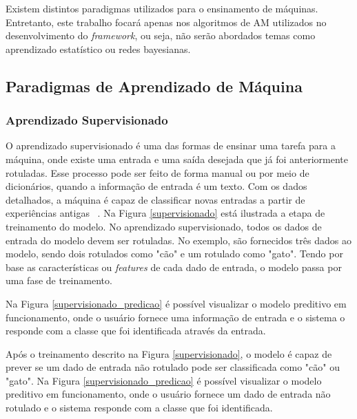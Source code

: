 Existem distintos paradigmas utilizados para o ensinamento de máquinas. 
Entretanto, este trabalho focará apenas nos algoritmos de \acrshort{AM} utilizados no desenvolvimento do \textit{framework}, ou seja, 
não serão abordados temas como aprendizado estatístico ou redes bayesianas.

  \subsection{Paradigmas de Aprendizado de Máquina}


    \subsubsection{Aprendizado Supervisionado}

      O aprendizado supervisionado é uma das formas de ensinar uma tarefa para a máquina, onde existe uma entrada e uma saída desejada que já foi 
      anteriormente rotuladas. Esse processo pode ser feito de forma manual ou por meio de dicionários, quando a informação de entrada é um texto.
      Com os dados detalhados, a máquina é capaz de classificar novas entradas a partir de experiências antigas ~\cite{mitchell}. Na Figura \ref{supervisionado}  está ilustrada
       a etapa de treinamento do modelo. No aprendizado supervisionado, todos os dados de entrada do modelo devem ser rotuladas. 
       No exemplo, são fornecidos três dados ao modelo, sendo dois rotulados como "cão" e um rotulado como "gato". Tendo por base as 
       características ou \textit{features} de cada dado de entrada, o modelo passa por uma fase de treinamento.
      


      Na Figura \ref{supervisionado_predicao} é possível visualizar o modelo preditivo em funcionamento, onde o usuário fornece uma informação de entrada
      e o sistema o responde com a classe que foi identificada através da entrada.

      Após o treinamento descrito na Figura \ref{supervisionado}, o modelo é capaz de prever se um dado de entrada não rotulado pode ser classificada como "cão" ou "gato". 
      Na Figura \ref{supervisionado_predicao} é possível visualizar o modelo preditivo em funcionamento, onde o usuário fornece um dado de entrada não rotulado e o sistema responde 
      com a classe que foi identificada.

